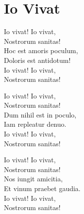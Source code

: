 \section{Io Vivat}
Io vivat! Io vivat,\\
Nostrorum sanitas!\\
Hoc est amoris poculum,\\
Doloris est antidotum!\\
Io vivat! Io vivat,\\
Nostrorum sanitas!

Io vivat! Io vivat,\\
Nostrorum sanitas!\\
Dum nihil est in poculo,\\
Iam repleatur denuo.\\
Io vivat! Io vivat,\\
Nostrorum sanitas!

Io vivat! Io vivat,\\
Nostrorum sanitas!\\
Nos iungit amicitia,\\
Et vinum praebet gaudia.\\
Io vivat! Io vivat,\\
Nostrorum sanitas!
